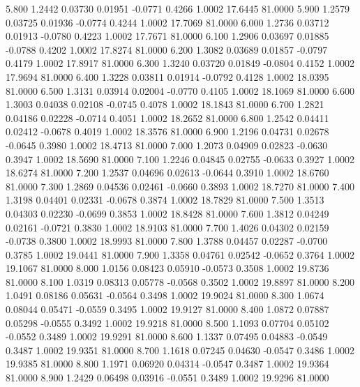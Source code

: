    5.800   1.2442   0.03730   0.01951  -0.0771   0.4266   1.0002  17.6445  81.0000
   5.900   1.2579   0.03725   0.01936  -0.0774   0.4244   1.0002  17.7069  81.0000
   6.000   1.2736   0.03712   0.01913  -0.0780   0.4223   1.0002  17.7671  81.0000
   6.100   1.2906   0.03697   0.01885  -0.0788   0.4202   1.0002  17.8274  81.0000
   6.200   1.3082   0.03689   0.01857  -0.0797   0.4179   1.0002  17.8917  81.0000
   6.300   1.3240   0.03720   0.01849  -0.0804   0.4152   1.0002  17.9694  81.0000
   6.400   1.3228   0.03811   0.01914  -0.0792   0.4128   1.0002  18.0395  81.0000
   6.500   1.3131   0.03914   0.02004  -0.0770   0.4105   1.0002  18.1069  81.0000
   6.600   1.3003   0.04038   0.02108  -0.0745   0.4078   1.0002  18.1843  81.0000
   6.700   1.2821   0.04186   0.02228  -0.0714   0.4051   1.0002  18.2652  81.0000
   6.800   1.2542   0.04411   0.02412  -0.0678   0.4019   1.0002  18.3576  81.0000
   6.900   1.2196   0.04731   0.02678  -0.0645   0.3980   1.0002  18.4713  81.0000
   7.000   1.2073   0.04909   0.02823  -0.0630   0.3947   1.0002  18.5690  81.0000
   7.100   1.2246   0.04845   0.02755  -0.0633   0.3927   1.0002  18.6274  81.0000
   7.200   1.2537   0.04696   0.02613  -0.0644   0.3910   1.0002  18.6760  81.0000
   7.300   1.2869   0.04536   0.02461  -0.0660   0.3893   1.0002  18.7270  81.0000
   7.400   1.3198   0.04401   0.02331  -0.0678   0.3874   1.0002  18.7829  81.0000
   7.500   1.3513   0.04303   0.02230  -0.0699   0.3853   1.0002  18.8428  81.0000
   7.600   1.3812   0.04249   0.02161  -0.0721   0.3830   1.0002  18.9103  81.0000
   7.700   1.4026   0.04302   0.02159  -0.0738   0.3800   1.0002  18.9993  81.0000
   7.800   1.3788   0.04457   0.02287  -0.0700   0.3785   1.0002  19.0441  81.0000
   7.900   1.3358   0.04761   0.02542  -0.0652   0.3764   1.0002  19.1067  81.0000
   8.000   1.0156   0.08423   0.05910  -0.0573   0.3508   1.0002  19.8736  81.0000
   8.100   1.0319   0.08313   0.05778  -0.0568   0.3502   1.0002  19.8897  81.0000
   8.200   1.0491   0.08186   0.05631  -0.0564   0.3498   1.0002  19.9024  81.0000
   8.300   1.0674   0.08044   0.05471  -0.0559   0.3495   1.0002  19.9127  81.0000
   8.400   1.0872   0.07887   0.05298  -0.0555   0.3492   1.0002  19.9218  81.0000
   8.500   1.1093   0.07704   0.05102  -0.0552   0.3489   1.0002  19.9291  81.0000
   8.600   1.1337   0.07495   0.04883  -0.0549   0.3487   1.0002  19.9351  81.0000
   8.700   1.1618   0.07245   0.04630  -0.0547   0.3486   1.0002  19.9385  81.0000
   8.800   1.1971   0.06920   0.04314  -0.0547   0.3487   1.0002  19.9364  81.0000
   8.900   1.2429   0.06498   0.03916  -0.0551   0.3489   1.0002  19.9296  81.0000
